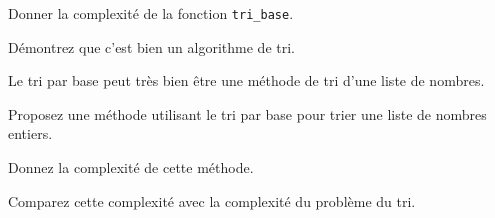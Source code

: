 \begin{exo}
\begin{partie}
\begin{questionpartie} 
Donner la complexité de la fonction \verb|tri_base|.
\end{questionpartie}

\begin{questionpartie} 
Démontrez que c'est bien un algorithme de tri.
\end{questionpartie}

\end{partie}

\begin{partie}[Conclusions]

Le tri par base peut très bien être une méthode de tri d'une liste de nombres.

\begin{questionpartie} 
Proposez une méthode utilisant le tri par base pour trier une liste de nombres entiers.
\end{questionpartie}

\begin{questionpartie} 
Donnez la complexité de cette méthode.
\end{questionpartie}

\begin{questionpartie} 
Comparez cette complexité avec la complexité du problème du tri.
\end{questionpartie}

\end{partie}
\end{exo}

\clearpage